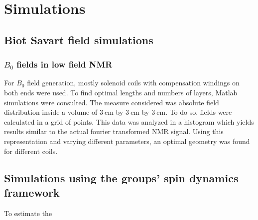 \chapter{Simulations}\label{chapter:simulations}
\section{Biot Savart field simulations}
	\subsection{$B_0$ fields in low field NMR}
		For $B_0$ field generation, mostly solenoid coils with compensation windings on both ends
		were used. To find optimal lengths and numbers of layers, Matlab simulations were consulted.
		The measure considered was absolute field distribution inside a volume of
		$\SI{3}{\centi\meter}$ by  $\SI{3}{\centi\meter}$ by $\SI{3}{\centi\meter}$. To do so,
		fields were calculated in a grid of  points. This data was analyzed in a
		histogram which yields results similar to the actual fourier transformed NMR signal.
		Using this representation and varying different parameters, an optimal geometry was
		found for different coils. 
\section{Simulations using the groups' spin dynamics framework}
	To estimate the 
